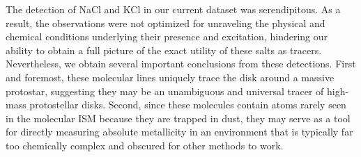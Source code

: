 \documentclass[12pt]{article}
\begin{document}
The detection of NaCl and KCl in our current dataset was serendipitous.  As a
result, the observations were not optimized for unraveling the physical and
chemical conditions underlying their presence and excitation, hindering our
ability to obtain a full picture of the exact utility of these salts as
tracers.  Nevertheless, we obtain several important conclusions from these
detections.  First and foremost, these molecular lines uniquely trace the disk
around a massive protostar, suggesting they may be an unambiguous and universal
tracer of high-mass protostellar disks. Second, since these molecules contain
atoms rarely seen in the molecular ISM because they are trapped in dust, they
may serve as a tool for directly measuring absolute metallicity in an
environment that is typically far too chemically complex and obscured for other
methods to work.



\end{document}
